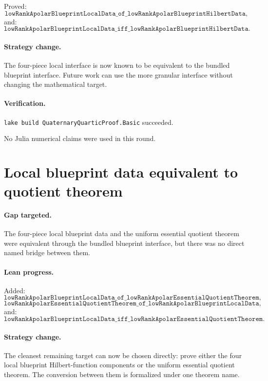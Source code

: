 \documentclass[11pt]{article}
\begin{document}
Proved:
\[
\texttt{lowRankApolarBlueprintLocalData\_of\_lowRankApolarBlueprintHilbertData},
\]
and:
\[
\texttt{lowRankApolarBlueprintLocalData\_iff\_lowRankApolarBlueprintHilbertData}.
\]

\paragraph{Strategy change.}
The four-piece local interface is now known to be equivalent to the bundled
blueprint interface.  Future work can use the more granular interface without
changing the mathematical target.

\paragraph{Verification.}
\texttt{lake build QuaternaryQuarticProof.Basic} succeeded.

No Julia numerical claims were used in this round.

\section*{Local blueprint data equivalent to quotient theorem}

\paragraph{Gap targeted.}
The four-piece local blueprint data and the uniform essential quotient theorem
were equivalent through the bundled blueprint interface, but there was no direct
named bridge between them.

\paragraph{Lean progress.}
Added:
\[
\texttt{lowRankApolarBlueprintLocalData\_of\_lowRankApolarEssentialQuotientTheorem},
\]
\[
\texttt{lowRankApolarEssentialQuotientTheorem\_of\_lowRankApolarBlueprintLocalData},
\]
and:
\[
\texttt{lowRankApolarBlueprintLocalData\_iff\_lowRankApolarEssentialQuotientTheorem}.
\]

\paragraph{Strategy change.}
The cleanest remaining target can now be chosen directly: prove either the
four local blueprint Hilbert-function components or the uniform essential
quotient theorem.  The conversion between them is formalized under one theorem
name.
\end{document}
